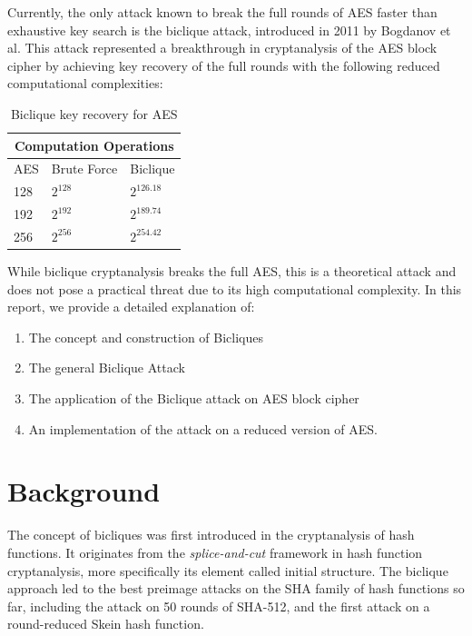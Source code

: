 \documentclass{report}
\begin{document}
Currently, the only attack known to break the full rounds of AES faster than exhaustive key search is the biclique attack, introduced in 2011 by Bogdanov et al\cite{bogdanov2011biclique}. This attack represented a breakthrough in cryptanalysis of the AES block cipher by achieving key recovery of the full rounds with the following reduced computational complexities: 

\begin{table}[h!]
    \centering
    \begin{tabular}{|p{3cm}|p{3cm}|p{3cm}|}
        \hline
        \multicolumn{3}{|c|}{Computation Operations} \\
        \hline
        AES & Brute Force & Biclique \\
        \hline
        128 & $2^{128}$ & $2^{126.18}$ \\
        \hline
        192 & $2^{192}$ & $2^{189.74}$ \\
        \hline
        256 & $2^{256}$ & $2^{254.42}$ \\
        \hline
    \end{tabular}
    \caption{Biclique key recovery for AES\cite{bogdanov2011biclique}}
    \label{table:1}
\end{table}

While biclique cryptanalysis breaks the full AES, this is a theoretical attack and does not pose a practical threat due to its high computational complexity. In this report, we provide a detailed explanation of: 
\begin{enumerate}
    \item     The concept and construction of Bicliques 
    \item     The general Biclique Attack 
    \item     The application of the Biclique attack on AES block cipher 
    \item     An implementation of the attack on a reduced version of AES. 
\end{enumerate}

\newpage
\section{Background}
The concept of bicliques was first introduced in the cryptanalysis of hash functions. It originates from the \emph{splice-and-cut} framework in hash function cryptanalysis, more specifically its element called initial structure. The biclique approach led to the best preimage attacks on the SHA family of hash functions so far, including the attack on 50 rounds of SHA-512, and the first attack on a round-reduced Skein hash function. \cite{bogdanov2011biclique} 
\end{document}
